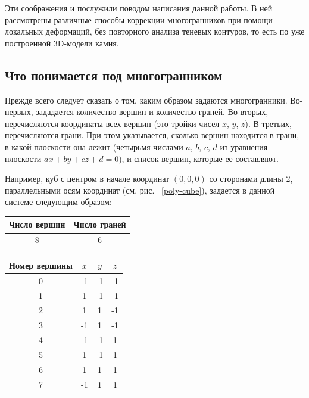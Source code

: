 \documentclass[a4paper,12pt, titlepage]{article}
\begin{document}
\begin{flushleft}
  Эти соображения и послужили поводом написания данной работы. В ней рассмотрены различные способы коррекции
многогранников при помощи локальных деформаций, без повторного анализа теневых контуров, то есть по уже 
построенной 3D-модели камня.
\end{flushleft}

\subsection{Что понимается под многогранником}
\begin{flushleft}
 Прежде всего следует сказать о том, каким образом задаются многогранники. Во-первых, зададается 
количество вершин и количество граней. Во-вторых, перечисляются координаты всех вершин (это тройки
чисел $x$, $y$, $z$). В-третьих, перечисляются грани. При этом указывается, сколько вершин находится в
грани, в какой плоскости она лежит (четырьмя числами $a$, $b$, $c$, $d$ из уравнения плоскости 
$a x + b y + c z + d = 0$), и список вершин, которые ее составляют.
\end{flushleft}
\begin{flushleft}
  Например, куб с центром в начале координат $(0, 0, 0)$ со сторонами длины 2, параллельными осям
  координат (см. рис. ~\ref{poly-cube}), задается в данной системе следующим образом:
\end{flushleft}
\begin{flushleft}
  \begin{tabular}{|c|c|}
  \hline
    Число вершин & Число граней \\
  \hline
    8 & 6 \\
  \hline 
  \end{tabular}
\end{flushleft}
\begin{flushleft}
  \begin{tabular}{|c|c|c|c|}
    \hline
    Номер вершины & $x$ & $y$ & $z$ \\
    \hline
    0 & -1 & -1 & -1 \\
    1 &  1 & -1 & -1 \\
    2 &  1 &  1 & -1 \\
    3 & -1 &  1 & -1 \\
    4 & -1 & -1 &  1 \\
    5 &  1 & -1 &  1 \\
    6 &  1 &  1 &  1 \\
    7 & -1 &  1 &  1 \\
    \hline
  \end{tabular}
\end{flushleft}
\end{document}
